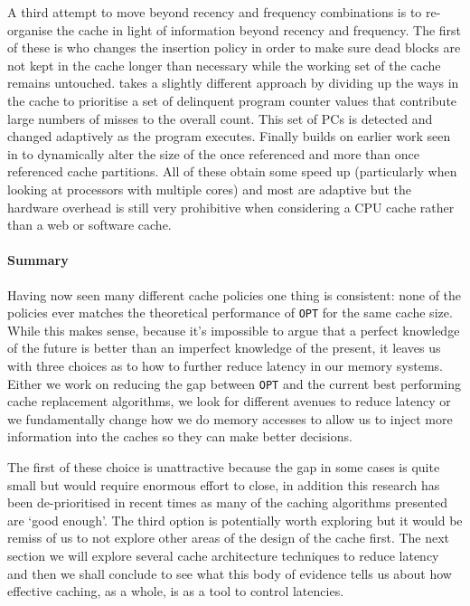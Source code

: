A third attempt to move beyond recency and frequency combinations is to re-organise the cache in light of information beyond recency and frequency. The first of these is \citet{chaudhuriPseudoLIFOFoundationNew2009} who changes the insertion policy in order to make sure dead blocks are not kept in the cache longer than necessary while the working set of the cache remains untouched. \citet{manikantanNUcacheEfficientMulticore2011} takes a slightly different approach by dividing up the ways in the cache to prioritise a set of delinquent program counter values that contribute large numbers of misses to the overall count. This set of PCs is detected and changed adaptively as the program executes. Finally \citet{khanDecoupledDynamicCache2012} builds on earlier work seen in \citet{johnson2QLowOverhead1994} to dynamically alter the size of the once referenced and more than once referenced cache partitions. All of these obtain some speed up (particularly when looking at processors with multiple cores) and most are adaptive but the hardware overhead is still very prohibitive when considering a CPU cache rather than a web or software cache.

\paragraph{Summary}

Having now seen many different cache policies one thing is consistent: none of the policies ever matches the theoretical performance of \texttt{OPT} for the same cache size. While this makes sense, because it's impossible to argue that a perfect knowledge of the future is better than an imperfect knowledge of the present, it leaves us with three choices as to how to further reduce latency in our memory systems. Either we work on reducing the gap between \texttt{OPT} and the current best performing cache replacement algorithms, we look for different avenues to reduce latency or we fundamentally change how we do memory accesses to allow us to inject more information into the caches so they can make better decisions.

The first of these choice is unattractive because the gap in some cases is quite small but would require enormous effort to close, in addition this research has been de-prioritised in recent times \cite{podlipnigSurveyWebCache2003} as many of the caching algorithms presented are `good enough'. The third option is potentially worth exploring but it would be remiss of us to not explore other areas of the design of the cache first. The next section we will explore several cache architecture techniques to reduce latency and then we shall conclude to see what this body of evidence tells us about how effective caching, as a whole, is as a tool to control latencies.

